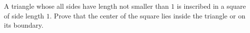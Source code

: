 A triangle whose all sides have length not smaller than $1$ is inscribed in a square of side length $1$. Prove that the center of the square lies inside the triangle or on its boundary.